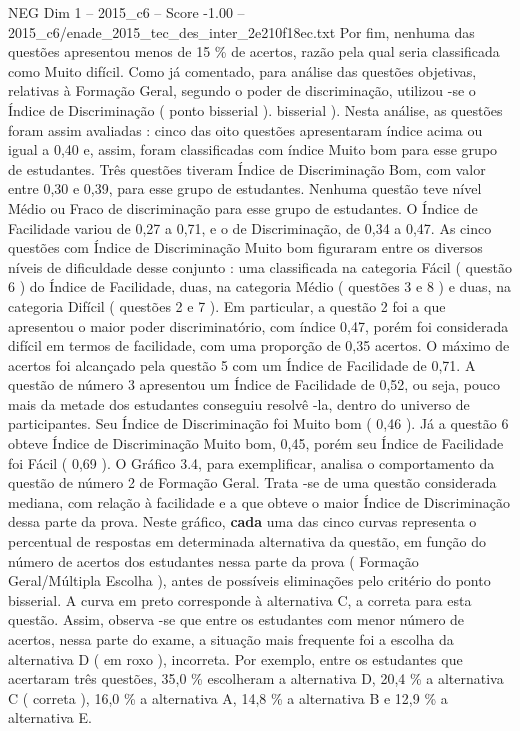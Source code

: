\begin{textsample}{NEG Dim 1 – 2015\_c6 – Score -1.00 – 2015\_c6/enade\_2015\_tec\_des\_inter\_2e210f18ec.txt}
Por fim, nenhuma das questões apresentou menos de 15 \% de acertos, razão pela qual seria classificada como Muito difícil.
Como já comentado, para análise das questões objetivas, relativas à Formação Geral, segundo o poder de discriminação, utilizou -se o Índice de Discriminação ( ponto bisserial ). bisserial ).
Nesta análise, as questões foram assim avaliadas : cinco das oito questões apresentaram índice acima ou igual a 0,40 e, assim, foram classificadas com índice Muito bom para esse grupo de estudantes.
Três questões tiveram Índice de Discriminação Bom, com valor entre 0,30 e 0,39, para esse grupo de estudantes.
Nenhuma questão teve nível Médio ou Fraco de discriminação para esse grupo de estudantes.
O Índice de Facilidade variou de 0,27 a 0,71, e o de Discriminação, de 0,34 a 0,47.
As cinco questões com Índice de Discriminação Muito bom figuraram entre os diversos níveis de dificuldade desse conjunto : uma classificada na categoria Fácil ( questão 6 ) do Índice de Facilidade, duas, na categoria Médio ( questões 3 e 8 ) e duas, na categoria Difícil ( questões 2 e 7 ).
Em particular, a questão 2 foi a que apresentou o maior poder discriminatório, com índice 0,47, porém foi considerada difícil em termos de facilidade, com uma proporção de 0,35 acertos.
O máximo de acertos foi alcançado pela questão 5 com um Índice de Facilidade de 0,71.
A questão de número 3 apresentou um Índice de Facilidade de 0,52, ou seja, pouco mais da metade dos estudantes conseguiu resolvê -la, dentro do universo de participantes.
Seu Índice de Discriminação foi Muito bom ( 0,46 ).
Já a questão 6 obteve Índice de Discriminação Muito bom, 0,45, porém seu Índice de Facilidade foi Fácil ( 0,69 ).
O Gráfico 3.4, para exemplificar, analisa o comportamento da questão de número 2 de Formação Geral.
Trata -se de uma questão considerada mediana, com relação à facilidade e a que obteve o maior Índice de Discriminação dessa parte da prova.
Neste gráfico, \textbf{cada} uma das cinco curvas representa o percentual de respostas em determinada alternativa da questão, em função do número de acertos dos estudantes nessa parte da prova ( Formação Geral/Múltipla Escolha ), antes de possíveis eliminações pelo critério do ponto bisserial.
A curva em preto corresponde à alternativa C, a correta para esta questão.
Assim, observa -se que entre os estudantes com menor número de acertos, nessa parte do exame, a situação mais frequente foi a escolha da alternativa D ( em roxo ), incorreta.
Por exemplo, entre os estudantes que acertaram três questões, 35,0 \% escolheram a alternativa D, 20,4 \% a alternativa C ( correta ), 16,0 \% a alternativa A, 14,8 \% a alternativa B e 12,9 \% a alternativa E.

\end{textsample}
